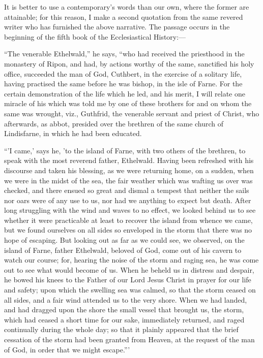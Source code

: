 It is better to use a contemporary's words than
our own, where the former are attainable; for this reason, I make a
second quotation from the same revered writer who has furnished the
above narrative. The passage occurs in the beginning of the fifth book
of the Ecclesiastical History:—

``The venerable Ethelwald,'' he says, ``who had
received the priesthood in the monastery of Ripon, and had, by actions
worthy of the same, sanctified his holy office, succeeded the man of
God, Cuthbert, in the exercise of a solitary life, having practised
the same before he was bishop, in the isle of Farne. For the certain
demonstration of the life which he led, and his merit, I will relate
one miracle of his which was told me by one of these brothers for and
on whom the same was wrought, viz., Guthfrid, the venerable servant
and priest of Christ, who afterwards, as abbot, presided over the
brethren of the same church of Lindisfarne, in which he had been
educated.

``'I came,' says he, 'to the island of Farne,
with two others of the brethren, to speak with the most reverend
father, Ethelwald. Having been refreshed with his discourse and taken
his blessing, as we were returning home, on a sudden, when we were in
the midst of the sea, the fair weather which was wafting us over was
checked, and there ensued so great and dismal a tempest that
neither the sails nor oars were of any use to us, nor had we anything
to expect but death. After long struggling with the wind and waves to
no effect, we looked behind us to see whether it were practicable at
least to recover the island from whence we came, but we found
ourselves on all sides so enveloped in the storm that there was no
hope of escaping. But looking out as far as we could see, we observed,
on the island of Farne, father Ethelwald, beloved of God, come out of
his cavern to watch our course; for, hearing the noise of the storm
and raging sea, he was come out to see what would become of us. When
he beheld us in distress and despair, he bowed his knees to the Father
of our Lord Jesus Christ in prayer for our life and safety; upon which
the swelling sea was calmed, so that the storm ceased on all sides,
and a fair wind attended us to the very shore. When we had landed, and
had dragged upon the shore the small vessel that brought us, the
storm, which had ceased a short time for our sake, immediately
returned, and raged continually during the whole day; so that it
plainly appeared that the brief cessation of the storm had been
granted from Heaven, at the request of the man of God, in order that
we might escape.'''

